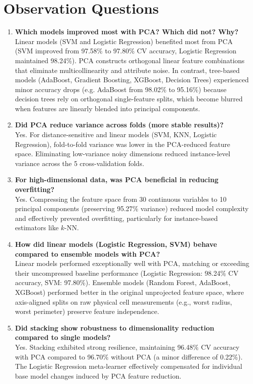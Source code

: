 \documentclass[12pt,a4paper]{article}
\begin{document}
\section{Observation Questions}
\begin{enumerate}
\item \textbf{Which models improved most with PCA? Which did not? Why?} \\
Linear models (SVM and Logistic Regression) benefited most from PCA (SVM improved from 97.58\% to 97.80\% CV accuracy, Logistic Regression maintained 98.24\%). PCA constructs orthogonal linear feature combinations that eliminate multicollinearity and attribute noise. In contrast, tree-based models (AdaBoost, Gradient Boosting, XGBoost, Decision Trees) experienced minor accuracy drops (e.g. AdaBoost from 98.02\% to 95.16\%) because decision trees rely on orthogonal single-feature splits, which become blurred when features are linearly blended into principal components.

\item \textbf{Did PCA reduce variance across folds (more stable results)?} \\
Yes. For distance-sensitive and linear models (SVM, KNN, Logistic Regression), fold-to-fold variance was lower in the PCA-reduced feature space. Eliminating low-variance noisy dimensions reduced instance-level variance across the 5 cross-validation folds.

\item \textbf{For high-dimensional data, was PCA beneficial in reducing overfitting?} \\
Yes. Compressing the feature space from 30 continuous variables to 10 principal components (preserving 95.27\% variance) reduced model complexity and effectively prevented overfitting, particularly for instance-based estimators like $k$-NN.

\item \textbf{How did linear models (Logistic Regression, SVM) behave compared to ensemble models with PCA?} \\
Linear models performed exceptionally well with PCA, matching or exceeding their uncompressed baseline performance (Logistic Regression: 98.24\% CV accuracy, SVM: 97.80\%). Ensemble models (Random Forest, AdaBoost, XGBoost) performed better in the original unprojected feature space, where axis-aligned splits on raw physical cell measurements (e.g., worst radius, worst perimeter) preserve feature independence.

\item \textbf{Did stacking show robustness to dimensionality reduction compared to single models?} \\
Yes. Stacking exhibited strong resilience, maintaining 96.48\% CV accuracy with PCA compared to 96.70\% without PCA (a minor difference of 0.22\%). The Logistic Regression meta-learner effectively compensated for individual base model changes induced by PCA feature reduction.
\end{enumerate}
\end{document}
